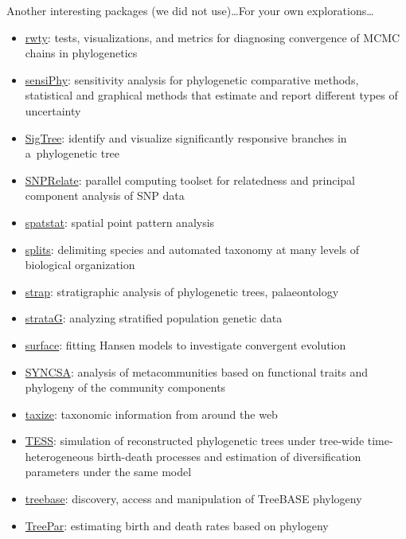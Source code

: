 \documentclass[compress, ucs, xelatex, 11pt, xcolor=svgnames,
  hyperref={
    bookmarks=true,
    unicode=true,
    colorlinks=true,
    pdftitle={Molecular data in R},
    plainpages=false,
    pdfauthor={Vojtech Zeisek},
    pdfsubject={Course about phylogeny and evolution in R},
    pdfcreator={XeLaTeX},
    pdfkeywords={R, evolution, phylogeny, molecular data},
    linkcolor=Tomato,
    anchorcolor=SaddleBrown,
    citecolor=Goldenrod,
    filecolor=DarkMagenta,
    menucolor=Sienna,
    urlcolor=DarkTurquoise,
    pdftex},
  url={hyphens, lowtilde} %
  ]{beamer}
\begin{document}
\begin{frame}[allowframebreaks]{Another interesting packages (we did not use)\ldots}{For your own explorations\ldots}
\begin{itemize}
    \item \href{https://CRAN.R-project.org/package=rwty}{rwty}: tests, visualizations, and metrics for diagnosing convergence of MCMC chains in phylogenetics
    \item \href{https://CRAN.R-project.org/package=sensiPhy}{sensiPhy}: sensitivity analysis for phylogenetic comparative methods,  statistical and graphical methods that estimate and report different types of uncertainty
    \item \href{https://CRAN.R-project.org/package=SigTree}{SigTree}: identify and visualize significantly responsive branches in a~phylogenetic tree
    \item \href{https://www.bioconductor.org/packages/release/bioc/html/SNPRelate.html}{SNPRelate}: parallel computing toolset for relatedness and principal component analysis of SNP data
    \item \href{https://CRAN.R-project.org/package=spatstat}{spatstat}: spatial point pattern analysis
    \item \href{https://r-forge.r-project.org/projects/splits/}{splits}: delimiting species and automated taxonomy at many levels of biological organization
    \item \href{https://CRAN.R-project.org/package=strap}{strap}: stratigraphic analysis of phylogenetic trees, palaeontology
    \item \href{https://CRAN.R-project.org/package=strataG}{strataG}: analyzing stratified population genetic data
    \item \href{https://CRAN.R-project.org/package=surface}{surface}: fitting Hansen models to investigate convergent evolution
    \item \href{https://CRAN.R-project.org/package=SYNCSA}{SYNCSA}: analysis of metacommunities based on functional traits and phylogeny of the community components
    \item \href{https://CRAN.R-project.org/package=taxize}{taxize}: taxonomic information from around the web
    \item \href{https://CRAN.R-project.org/package=TESS}{TESS}: simulation of reconstructed phylogenetic trees under tree-wide time-heterogeneous birth-death processes and estimation of diversification parameters under the same model
    \item \href{https://CRAN.R-project.org/package=treebase}{treebase}:  discovery, access and manipulation of TreeBASE phylogeny
    \item \href{https://CRAN.R-project.org/package=TreePar}{TreePar}: estimating birth and death rates based on phylogeny

\end{itemize}
\end{frame}
\end{document}
